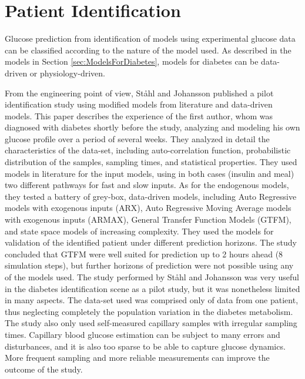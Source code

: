 \section{Patient Identification}
\label{sec:GlucoseCurveFitting} 

Glucose prediction from identification of models using experimental glucose data can be classified according to the nature of the model used. As described in the models in Section \ref{sec:ModelsForDiabetes}, models for diabetes can be data-driven or physiology-driven. 

From the engineering point of view, St{\aa}hl and Johansson published a pilot identification study \cite{stahl2009diabetes} using modified models from literature and data-driven models. This paper describes the experience of the first author, whom was diagnosed with diabetes shortly before the study, analyzing and modeling his own glucose profile over a period of several weeks. They analyzed in detail the characteristics of the data-set, including auto-correlation function, probabilistic distribution of the samples, sampling times, and statistical properties. They used models in literature for the input models, using in both cases (insulin and meal) two different pathways for fast and slow inputs. As for the endogenous models, they tested a battery of grey-box, data-driven models, including Auto Regressive models with exogenous inputs (ARX), Auto Regressive Moving Average models with exogenous inputs (ARMAX), General Transfer Function Models (GTFM), and state space models of increasing complexity. They used the models for validation of the identified patient under different prediction horizons. The study concluded that GTFM were well suited for prediction up to 2 hours ahead (8 simulation steps), but further horizons of prediction were not possible using any of the models used. 
The study performed by St{\aa}hl and Johansson was very useful in the diabetes identification scene as a pilot study, but it was nonetheless limited in many aspects. The data-set used was comprised only of data from one patient, thus neglecting completely the population variation in the diabetes metabolism. The study also only used self-measured capillary samples with irregular sampling times. Capillary blood glucose estimation can be subject to many errors and disturbances, and it is also too sparse to be able to capture glucose dynamics. More frequent sampling and more reliable measurements can improve the outcome of the study.

